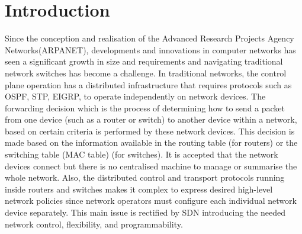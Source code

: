 \documentclass{article}
\begin{document}
\section{Introduction}
Since the conception and realisation of the Advanced Research Projects Agency Networks(ARPANET)\cite{5432117}, developments and innovations in computer networks has seen a significant growth in size and requirements and navigating traditional network switches has become a challenge. In traditional networks, the control plane operation has a distributed infrastructure that requires protocols such as OSPF, STP, EIGRP, to operate independently on network devices. The forwarding decision which is the process of determining how to send a packet from one device (such as a router or switch) to another device within a network, based on certain criteria is performed by these network devices. This decision is made based on the information available in the routing table (for routers) or the switching table (MAC table) (for switches). It is accepted that the network devices connect but there is no centralised machine to manage or summarise the whole network\cite{Haji_Zeebaree_Saeed_Ameen_Shukur_Omar_Sadeeq_Ageed_Ibrahim_Yasin_2021}. Also, the distributed control and transport protocols running inside routers and switches makes it complex to express desired high-level network policies since network operators must configure each individual network device separately\cite{6994333}. This main issue is rectified by SDN introducing the needed network control, flexibility, and programmability.\\
\end{document}
